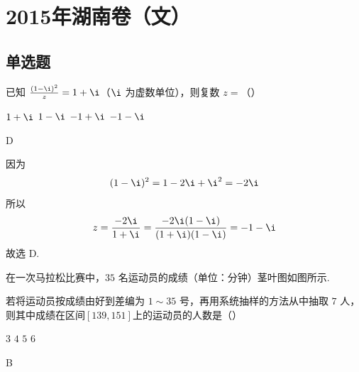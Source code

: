 \chapter{2015年湖南卷（文）}

\section{单选题}

\begin{problem}
已知 \(\frac{(1 - \i)^2}{z} = 1 + \i\)（\(\i\) 为虚数单位），则复数 \(z =\)（\quad）

\choices
    {\(1 + \i\)}
    {\(1 - \i\)}
    {\(-1 + \i\)}
    {\(-1 - \i\)}
\end{problem}

\begin{answer}
D
\end{answer}

\begin{solution}
因为
\[
(1-\i)^2=1-2\i+\i^2=-2\i
\]
所以
\[
z=\frac{-2\i}{1+\i}=\frac{-2\i(1-\i)}{(1+\i)(1-\i)}=-1-\i
\]
故选 D.
\end{solution}

\begin{problem}
在一次马拉松比赛中，\(35\) 名运动员的成绩（单位：\(\text{分钟}\)）茎叶图如图所示.


若将运动员按成绩由好到差编为 \(1\sim 35\) 号，再用系统抽样的方法从中抽取 \(7\) 人，则其中成绩在区间\([139, 151]\)上的运动员的人数是（\quad）

\choices
    {\(3\)}
    {\(4\)}
    {\(5\)}
    {\(6\)}
\end{problem}

\begin{answer}
B
\end{answer}

